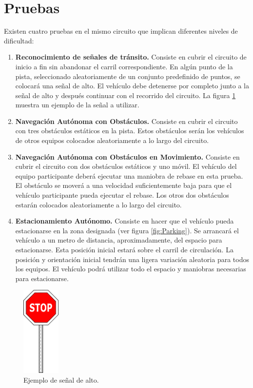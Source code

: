 \documentclass[letterpaper,12pt]{article}
\begin{document}
\section{Pruebas}
Existen cuatro pruebas en el mismo circuito que implican diferentes niveles de dificultad:

\begin{enumerate}
\item \textbf{Reconocimiento de señales de tránsito.} Consiste en cubrir el circuito de inicio a fin sin abandonar el carril correspondiente. En algún punto de la pista, seleccionado aleatoriamente de un conjunto predefinido de puntos, se colocará una señal de alto. El vehículo debe detenerse por completo junto a la señal de alto y después continuar con el recorrido del circuito. La figura \ref{fig:stopsign} muestra un ejemplo de la señal a utilizar. 
\item \textbf{Navegación Autónoma con Obstáculos.} Consiste en cubrir el circuito con tres obstáculos estáticos en la pista. Estos obstáculos serán los vehículos de otros equipos colocados aleatoriamente a lo largo del circuito.
\item \textbf{Navegación Autónoma con Obstáculos en Movimiento.} Consiste en cubrir el circuito con dos obstáculos estáticos y uno móvil. El vehículo del equipo participante deberá ejecutar una maniobra de rebase en esta prueba. El obstáculo se moverá a una velocidad suficientemente baja para que el vehículo participante pueda ejecutar el rebase. Los otros dos obstáculos estarán colocados aleatoriamente a lo largo del circuito.
  \item \textbf{Estacionamiento Autónomo.} Consiste en hacer que el vehículo pueda estacionarse en la zona designada (ver figura \ref{fig:Parking}). Se arrancará el vehículo a un metro de distancia, aproximadamente, del espacio para estacionarse. Esta posición inicial estará sobre el carril de circulación. La posición y orientación inicial tendrán una ligera variación aleatoria para todos los equipos. El vehículo podrá utilizar todo el espacio y maniobras necesarias para estacionarse. 
\end{enumerate}
\begin{figure}
  \centering
  \includegraphics[width=0.17\textwidth]{Figures/alto.png}
  \caption{Ejemplo de señal de alto.}
  \label{fig:stopsign}
\end{figure}
\end{document}

